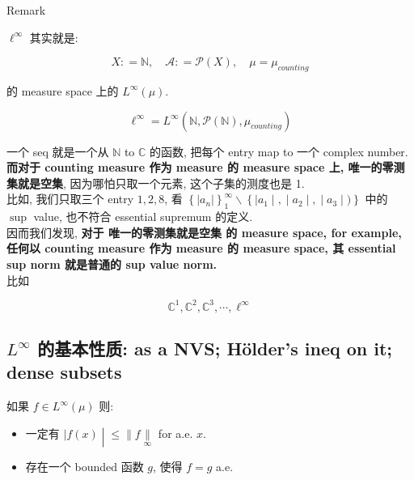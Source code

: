 \documentclass{qlnotes-export}
\begin{document}
\begin{qlremark}{Remark}

\(\ell^{\infty}\) 其实就是:

\[X: = {\mathbb{N}},\quad\mathcal{A}: = \mathcal{P}(X),\quad\mu = \mu_{counting}\]

的 measure space 上的 \(L^{\infty}(\mu)\).

\[\ell^{\infty} = L^{\infty}({\mathbb{N}},\mathcal{P}({\mathbb{N}}),\mu_{counting})\]

一个 seq 就是一个从 \(\mathbb{N}\) to \(\mathbb{C}\) 的函数, 把每个 entry map to 一个 complex number.\\
\textbf{而对于 counting measure 作为 measure 的 measure space 上, 唯一的零测集就是空集}, 因为哪怕只取一个元素, 这个子集的测度也是 1.\\
比如, 我们只取三个 entry \(1,2,8\), 看 \(\left\{ {|a_{n}|} \right\}_{1}^{\infty}\backslash\left\{ |a_{1} \middle| , \middle| a_{2} \middle| , \middle| a_{3} \middle| ) \right\}\) 中的 \(\sup\) value, 也不符合 essential supremum 的定义.\\
因而我们发现, \textbf{对于 唯一的零测集就是空集 的 measure space, for example, 任何以 counting measure 作为 measure 的 measure space, 其 essential sup norm 就是普通的 sup value norm.}\\
比如

\[{\mathbb{C}}^{1},{\mathbb{C}}^{2},{\mathbb{C}}^{3},\cdots,\ell^{\infty}\]

\end{qlremark}

\subsection{\texorpdfstring{\(L^{\infty}\) 的基本性质: as a NVS; Hölder's ineq on it; dense subsets}{L\^{}\{\textbackslash infty\} 的基本性质: as a NVS; Hölder's ineq on it; dense subsets}}\label{linfty-ux7684ux57faux672cux6027ux8d28-as-a-nvs-huxf6lders-ineq-on-it-dense-subsets}

\begin{lemma}\label{lem-09-l-p-space-and-inequalities-lemma-004}

如果 \(f \in L^{\infty}(\mu)\) 则:

\begin{itemize}
\item
  一定有 \(\left. |f(x) \middle| \leq \parallel f\underset{\infty}{\parallel} \right.\) for a.e. \(x\).
\item
  存在一个 bounded 函数 \(g\), 使得 \(f = g\) a.e.
\end{itemize}

\end{lemma}
\end{document}
